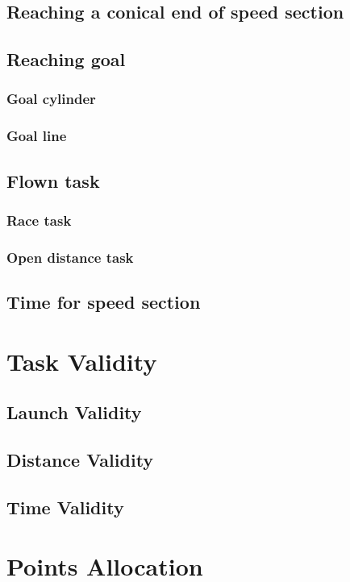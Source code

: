 \documentclass{article}
\begin{document}
\subsection{Reaching a conical end of speed section}
\subsection{Reaching goal}
\subsubsection{Goal cylinder}
\subsubsection{Goal line}
\subsection{Flown task}
\subsubsection{Race task}
\subsubsection{Open distance task}
\subsection{Time for speed section}

\newpage
\section{Task Validity}
\subsection{Launch Validity}
\subsection{Distance Validity}
\subsection{Time Validity}

\newpage
\section{Points Allocation}
\end{document}

